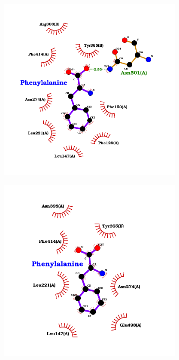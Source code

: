 \documentclass[12pt]{article}
\begin{document}
	\FloatBarrier
	\begin{figure}[H]
		\centering
		\begin{subfigure}[H]{0.35\textwidth}
			\hspace{2cm}
			\includegraphics[width=\textwidth]{../1/Dock/best.png}
			\caption{}
		\end{subfigure}
		\hfill
		\begin{subfigure}[H]{0.35\textwidth}
			\hspace{-2cm}
			\includegraphics[width=\textwidth]{../1/Dock/best2.png}

\end{subfigure}
\end{figure}
\end{document}
